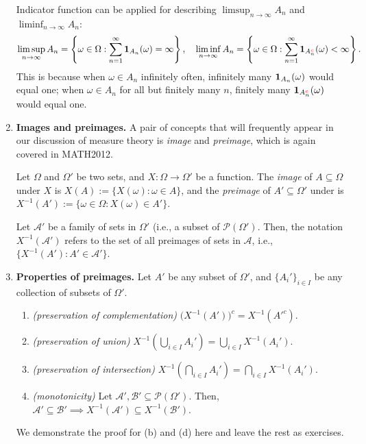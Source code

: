 \begin{enumerate}
Indicator function can be applied for describing \(\limsup_{n\to \infty}A_n\)
and \(\liminf_{n\to \infty}A_n\):
\[
\limsup_{n\to \infty}A_n
=\left\{\omega\in\Omega:\sum_{n=1}^{\infty}\mathbf{1}_{A_n}(\omega)=\infty\right\},\quad
\liminf_{n\to \infty}A_n
=\left\{\omega\in\Omega:\sum_{n=1}^{\infty}\mathbf{1}_{A_{n}^{{\color{red}c}}}(\omega)<\infty\right\}.
\]
This is because when \(\omega\in A_n\) infinitely often, infinitely many
\(\mathbf{1}_{A_n}(\omega)\) would equal one; when \(\omega\in A_n\) for all but
finitely many \(n\), finitely many \(\mathbf{1}_{A_n^{{\color{red}c}}}(\omega)\) would
equal one.

\item \textbf{Images and preimages.} A pair of concepts that will frequently
appear in our discussion of measure theory is \emph{image} and \emph{preimage},
which is again covered in MATH2012.

Let \(\Omega\) and \(\Omega'\) be two sets, and \(X:\Omega\to\Omega'\) be a
function.  The \emph{image} of \(A\subseteq \Omega\) under \(X\) is
\(X(A):=\{X(\omega):\omega\in A\}\), and the \emph{preimage} of \(A'\subseteq
\Omega'\) under  is \(X^{-1}(A'):=\{\omega\in\Omega:X(\omega)\in A'\}\).
\begin{center}
\end{center}
Let \(\mathcal{A}'\) be a family of sets in \(\Omega'\) (i.e., a subset of
\(\mathcal{P}(\Omega')\). Then, the notation \(X^{-1}(\mathcal{A}')\) refers to
the set of all preimages of sets in \(\mathcal{A}\), i.e.,
\(\{X^{-1}(A'):A'\in\mathcal{A}'\}\).
\item\label{it:preimg-prop} \textbf{Properties of preimages.} Let \(A'\) be any
subset of \(\Omega'\), and \(\{A_i'\}_{i\in I}\) be any collection of subsets of
\(\Omega'\).
\begin{enumerate}
\item \emph{(preservation of complementation)} \(\big(X^{-1}(A')\big)^{c}=X^{-1}(A'^{c})\).
\item \emph{(preservation of union)} \(X^{-1}(\bigcup_{i\in I}A_i')=\bigcup_{i\in I}X^{-1}(A_i')\).
\item \emph{(preservation of intersection)} \(X^{-1}(\bigcap_{i\in I}A_i')=\bigcap_{i\in I}X^{-1}(A_i')\).
\item \emph{(monotonicity)} Let \(\mathcal{A}',\mathcal{B}'\subseteq
\mathcal{P}(\Omega')\). Then, \(\mathcal{A}'\subseteq \mathcal{B}'\implies
X^{-1}(\mathcal{A}')\subseteq X^{-1}(\mathcal{B}')\).
\end{enumerate}
\begin{pf}
We demonstrate the proof for (b) and (d) here and leave the rest as exercises.


\end{pf}
\end{enumerate}
